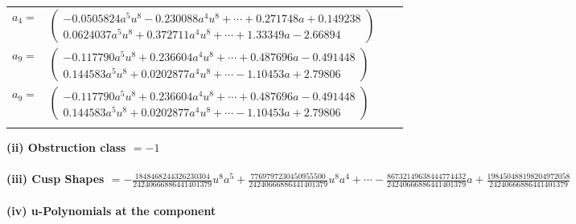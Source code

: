 \documentclass[1p]{elsarticle_modified}
\theoremstyle{definition}
\begin{document}
\begin{tabular}{m{7pt} m{180pt} m{7pt} m{180pt} }
\flushright $a_{4}=$&$\begin{pmatrix}-0.0505824 a^{5} u^{8}-0.230088 a^{4} u^{8}+\cdots+0.271748 a+0.149238\\0.0624037 a^{5} u^{8}+0.372711 a^{4} u^{8}+\cdots+1.33349 a-2.66894\end{pmatrix}$ \\
\flushright $a_{9}=$&$\begin{pmatrix}-0.117790 a^{5} u^{8}+0.236604 a^{4} u^{8}+\cdots+0.487696 a-0.491448\\0.144583 a^{5} u^{8}+0.0202877 a^{4} u^{8}+\cdots-1.10453 a+2.79806\end{pmatrix}$\\ \flushright $a_{9}=$&$\begin{pmatrix}-0.117790 a^{5} u^{8}+0.236604 a^{4} u^{8}+\cdots+0.487696 a-0.491448\\0.144583 a^{5} u^{8}+0.0202877 a^{4} u^{8}+\cdots-1.10453 a+2.79806\end{pmatrix}$\\&\end{tabular}
\flushleft \textbf{(ii) Obstruction class $= -1$}\\~\\
\flushleft \textbf{(iii) Cusp Shapes $= -\frac{1848468244326230304}{24240666886441401379} u^8 a^5+\frac{7769797230450955500}{24240666886441401379} u^8 a^4+\cdots-\frac{86732149638444774432}{24240666886441401379} a+\frac{198450488198204972058}{24240666886441401379}$}\\~\\
\newpage\renewcommand{\arraystretch}{1}
\flushleft \textbf{(iv) u-Polynomials at the component}\newline \\
\end{document}
